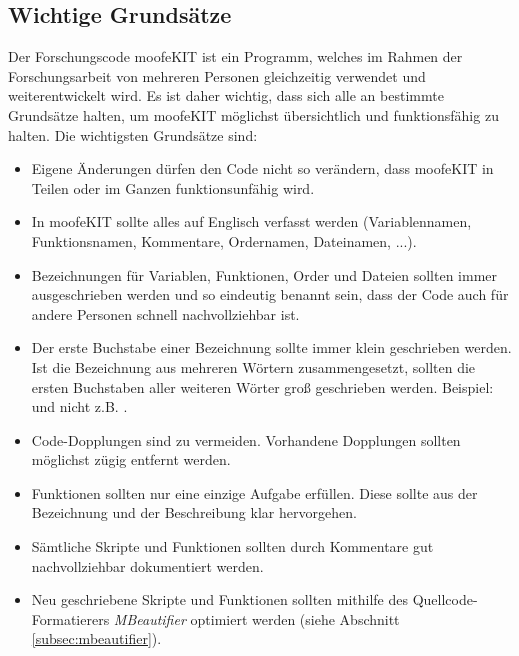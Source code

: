 \documentclass[12pt,bibstyle=none,pagenumberinfooter]{ifmdocument}
\begin{document}
\subsection{Wichtige Grundsätze}
Der Forschungscode moofeKIT ist ein Programm, welches im Rahmen der Forschungsarbeit von mehreren Personen gleichzeitig verwendet und weiterentwickelt wird. Es ist daher wichtig, dass sich alle an bestimmte Grundsätze halten, um moofeKIT möglichst übersichtlich und funktionsfähig zu halten. Die wichtigsten Grundsätze sind:
\begin{itemize}
\item Eigene Änderungen dürfen den Code nicht so verändern, dass moofeKIT in Teilen oder im Ganzen funktionsunfähig wird.
\item In moofeKIT sollte alles auf Englisch verfasst werden (Variablennamen, Funktionsnamen, Kommentare, Ordernamen, Dateinamen, ...).
\item Bezeichnungen für Variablen, Funktionen, Order und Dateien sollten immer ausgeschrieben werden und so eindeutig benannt sein, dass der Code auch für andere Personen schnell nachvollziehbar ist.
\item Der erste Buchstabe einer Bezeichnung sollte immer klein geschrieben werden. Ist die Bezeichnung aus mehreren Wörtern zusammengesetzt, sollten die ersten Buchstaben aller weiteren Wörter groß geschrieben werden. Beispiel:  und nicht z.B. .
\item Code-Dopplungen sind zu vermeiden. Vorhandene Dopplungen sollten möglichst zügig entfernt werden.
\item Funktionen sollten nur eine einzige Aufgabe erfüllen. Diese sollte aus der Bezeichnung und der Beschreibung klar hervorgehen.
\item Sämtliche Skripte und Funktionen sollten durch Kommentare gut nachvollziehbar dokumentiert werden.
\item Neu geschriebene Skripte und Funktionen sollten mithilfe des Quellcode-Formatierers \textit{MBeautifier} optimiert werden (siehe Abschnitt \ref{subsec:mbeautifier}).

\end{itemize} 
\end{document}
